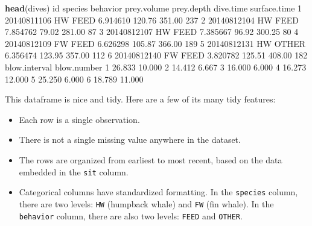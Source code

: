 \documentclass[
]{book}
\newenvironment{Shaded}{\begin{snugshade}}{\end{snugshade}}
\newcommand{\DecValTok}[1]{\textcolor[rgb]{0.00,0.00,0.81}{#1}}
\newcommand{\FloatTok}[1]{\textcolor[rgb]{0.00,0.00,0.81}{#1}}
\newcommand{\KeywordTok}[1]{\textcolor[rgb]{0.13,0.29,0.53}{\textbf{#1}}}
\newcommand{\NormalTok}[1]{#1}
\begin{document}
\begin{Shaded}
\begin{Highlighting}[]
\KeywordTok{head}\NormalTok{(dives)}
\NormalTok{           id species behavior prey.volume prey.depth dive.time surface.time}
\DecValTok{1} \DecValTok{20140811106}\NormalTok{      HW     FEED    }\FloatTok{6.914610}     \FloatTok{120.76}    \FloatTok{351.00}          \DecValTok{237}
\DecValTok{2} \DecValTok{20140812104}\NormalTok{      HW     FEED    }\FloatTok{7.854762}      \FloatTok{79.02}    \FloatTok{281.00}           \DecValTok{87}
\DecValTok{3} \DecValTok{20140812107}\NormalTok{      HW     FEED    }\FloatTok{7.385667}      \FloatTok{96.92}    \FloatTok{300.25}           \DecValTok{80}
\DecValTok{4} \DecValTok{20140812109}\NormalTok{      FW     FEED    }\FloatTok{6.626298}     \FloatTok{105.87}    \FloatTok{366.00}          \DecValTok{189}
\DecValTok{5} \DecValTok{20140812131}\NormalTok{      HW    OTHER    }\FloatTok{6.356474}     \FloatTok{123.95}    \FloatTok{357.00}          \DecValTok{112}
\DecValTok{6} \DecValTok{20140812140}\NormalTok{      FW     FEED    }\FloatTok{3.820782}     \FloatTok{125.51}    \FloatTok{408.00}          \DecValTok{182}
\NormalTok{  blow.interval blow.number}
\DecValTok{1}        \FloatTok{26.833}      \FloatTok{10.000}
\DecValTok{2}        \FloatTok{14.412}       \FloatTok{6.667}
\DecValTok{3}        \FloatTok{16.000}       \FloatTok{6.000}
\DecValTok{4}        \FloatTok{16.273}      \FloatTok{12.000}
\DecValTok{5}        \FloatTok{25.250}       \FloatTok{6.000}
\DecValTok{6}        \FloatTok{18.789}      \FloatTok{11.000}
\end{Highlighting}
\end{Shaded}

This dataframe is nice and tidy. Here are a few of its many tidy features:

\begin{itemize}
\item
  Each row is a single observation.
\item
  There is not a single missing value anywhere in the dataset.
\item
  The rows are organized from earliest to most recent, based on the data embedded in the \texttt{sit} column.
\item
  Categorical columns have standardized formatting. In the \texttt{species} column, there are two levels: \texttt{HW} (humpback whale) and \texttt{FW} (fin whale). In the \texttt{behavior} column, there are also two levels: \texttt{FEED} and \texttt{OTHER}.
\end{itemize}
\end{document}
